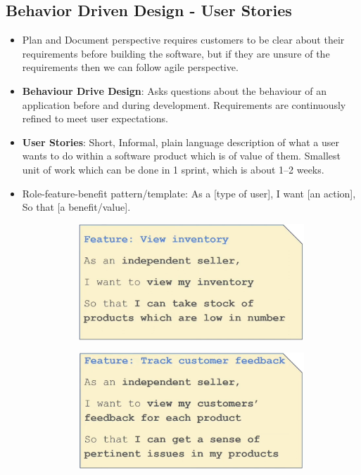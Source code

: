 \documentclass[a4paper]{article}
\begin{document}
\subsection{Behavior Driven Design - User Stories}
\begin{itemize}
    \item Plan and Document perspective requires customers to be clear about their requirements before building the software, but if they are unsure of the requirements then we can follow agile perspective.
    \item \textbf{Behaviour Drive Design}: Asks questions about the behaviour of an application before and during development. Requirements are continuously refined to meet user expectations.
    \item \textbf{User Stories}: Short, Informal, plain language description of what a user wants to do within a software product which is of value of them. Smallest unit of work which can be done in 1 sprint, which is about 1–2 weeks.
    \item Role-feature-benefit pattern/template: As a [type of user], I want [an action], So that [a benefit/value].
    \begin{figure}[H]
        \centering
        \begin{subfigure}[b]{0.45\textwidth}
            \centering
            \includegraphics[width=\textwidth]{Degree/static/SE_user_story_1.png}
        \end{subfigure}
        \hfill
        \begin{subfigure}[b]{0.45\textwidth}
            \centering
            \includegraphics[width=\textwidth]{Degree/static/SE_user_story_2.png}

\end{subfigure}
\end{figure}
\end{itemize}
\end{document}
